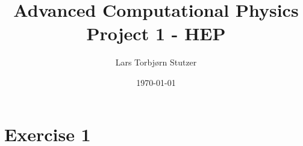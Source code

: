 \documentclass{article}
\title{Advanced Computational Physics Project 1 - HEP}
\author{Lars Torbj\o rn Stutzer}
\date{\today}
\begin{document}
\maketitle


\section[short]{Exercise 1}
\end{document}
